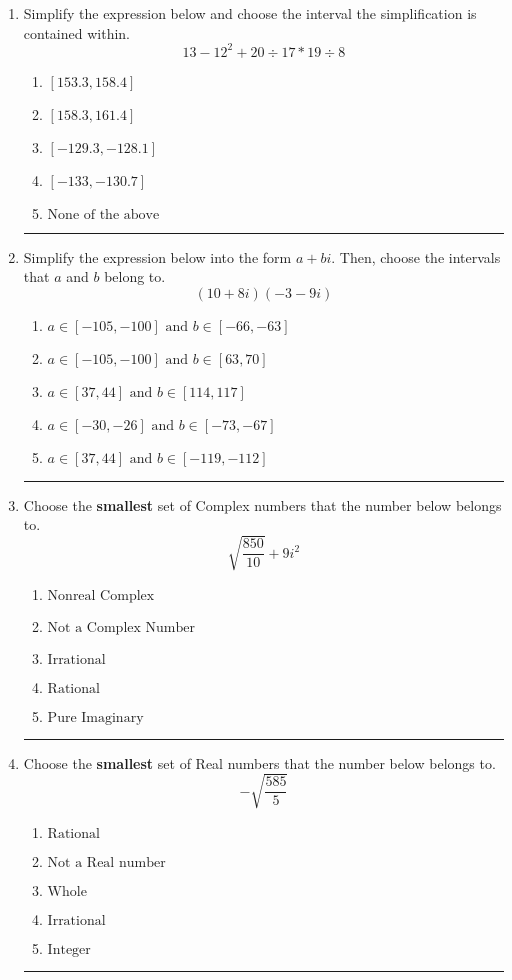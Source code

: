 \documentclass[14pt]{extbook}
\newcommand{\litem}[1]{\item#1\hspace*{-1cm}\rule{\textwidth}{0.4pt}}
\begin{document}
\begin{enumerate}
{\begin{enumerate}[label=\Alph*.]
\end{enumerate} }
\litem{
Simplify the expression below and choose the interval the simplification is contained within.\[ 13 - 12^2 + 20 \div 17 * 19 \div 8 \]\begin{enumerate}[label=\Alph*.]
\item \( [153.3, 158.4] \)
\item \( [158.3, 161.4] \)
\item \( [-129.3, -128.1] \)
\item \( [-133, -130.7] \)
\item \( \text{None of the above} \)

\end{enumerate} }
\litem{
Simplify the expression below into the form $a+bi$. Then, choose the intervals that $a$ and $b$ belong to.\[ (10 + 8 i)(-3 - 9 i) \]\begin{enumerate}[label=\Alph*.]
\item \( a \in [-105, -100] \text{ and } b \in [-66, -63] \)
\item \( a \in [-105, -100] \text{ and } b \in [63, 70] \)
\item \( a \in [37, 44] \text{ and } b \in [114, 117] \)
\item \( a \in [-30, -26] \text{ and } b \in [-73, -67] \)
\item \( a \in [37, 44] \text{ and } b \in [-119, -112] \)

\end{enumerate} }
\litem{
Choose the \textbf{smallest} set of Complex numbers that the number below belongs to.\[ \sqrt{\frac{850}{10}}+9i^2 \]\begin{enumerate}[label=\Alph*.]
\item \( \text{Nonreal Complex} \)
\item \( \text{Not a Complex Number} \)
\item \( \text{Irrational} \)
\item \( \text{Rational} \)
\item \( \text{Pure Imaginary} \)

\end{enumerate} }
\litem{
Choose the \textbf{smallest} set of Real numbers that the number below belongs to.\[ -\sqrt{\frac{585}{5}} \]\begin{enumerate}[label=\Alph*.]
\item \( \text{Rational} \)
\item \( \text{Not a Real number} \)
\item \( \text{Whole} \)
\item \( \text{Irrational} \)
\item \( \text{Integer} \)


\end{enumerate}}
\end{enumerate}
\end{document}
